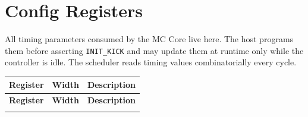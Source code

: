 \documentclass[11pt,a4paper]{article}
\newcommand{\reg}[1]{\textcolor{ddrpurple}{\texttt{#1}}}
\begin{document}
\section{Config Registers}

All timing parameters consumed by the MC Core live here. The host programs them
before asserting \reg{INIT\_KICK} and may update them at runtime only while the
controller is idle. The scheduler reads timing values combinatorially every cycle.

\begin{longtable}{L{3cm} C{1.5cm} L{9cm}}
\toprule
\textbf{Register} & \textbf{Width} & \textbf{Description} \\
\midrule
\endfirsthead
\toprule\textbf{Register}&\textbf{Width}&\textbf{Description}\\\midrule\endhead
\bottomrule\endfoot


\end{longtable}
\end{document}
